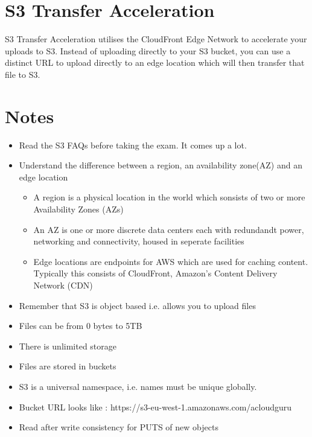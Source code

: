 \documentclass{article}
\begin{document}
\section{S3 Transfer Acceleration}
S3 Transfer Acceleration utilises the CloudFront Edge Network to accelerate your uploads to S3. Instead of uploading directly to your S3 bucket, you can use a distinct URL to upload directly to an edge location which will then transfer that file to S3.


\section{Notes}
\begin{itemize}
\item
Read the S3 FAQs before taking the exam. It comes up a lot.

\item
Understand the difference between a region, an availability zone(AZ) and an edge location
	\begin{itemize}
	\item
	A region is a physical location in the world which sonsists of two or more Availability Zones (AZs)

	\item
	An AZ is one or more discrete data centers each with redundandt power, networking and connectivity, housed in seperate facilities

	\item
	Edge locations are endpoints for AWS which are used for caching content. Typically this consists of CloudFront, Amazon's Content Delivery Network (CDN)
\end{itemize}

\item
Remember that S3 is object based i.e. allows you to upload files

\item
Files can be from 0 bytes to 5TB

\item
There is unlimited storage

\item
Files are stored in buckets

\item
S3 is a universal namespace, i.e. names must be unique globally.

\item
Bucket URL looks like : https://s3-eu-west-1.amazonaws.com/acloudguru

\item
Read after write consistency for PUTS of new objects


\end{itemize}
\end{document}
